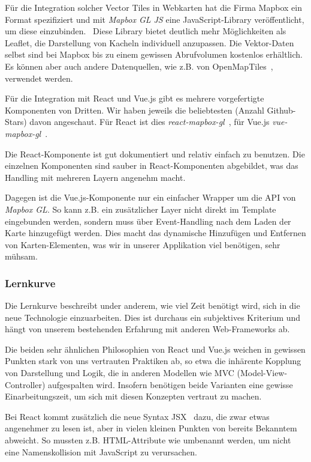 Für die Integration solcher Vector Tiles in Webkarten hat die Firma Mapbox ein Format spezifiziert und mit \emph{Mapbox GL JS} eine JavaScript-Library veröffentlicht, um diese einzubinden.~\cite{mapbox_gl_js}
Diese Library bietet deutlich mehr Möglichkeiten als Leaflet, die Darstellung von Kacheln individuell anzupassen.
Die Vektor-Daten selbst sind bei Mapbox bis zu einem gewissen Abrufvolumen kostenlos erhältlich.
Es können aber auch andere Datenquellen, wie z.B. von OpenMapTiles~\cite{openmaptiles}, verwendet werden.

Für die Integration mit React und Vue.js gibt es mehrere vorgefertigte Komponenten von Dritten.
Wir haben jeweils die beliebtesten (Anzahl Github-Stars) davon angeschaut.
Für React ist dies \emph{react-mapbox-gl}~\cite{react_mapbox_gl}, für Vue.js \emph{vue-mapbox-gl}~\cite{vue_mapbox_gl}.

Die React-Komponente ist gut dokumentiert und relativ einfach zu benutzen.
Die einzelnen Komponenten sind sauber in React-Komponenten abgebildet, was das Handling mit mehreren Layern angenehm macht.

Dagegen ist die Vue.js-Komponente nur ein einfacher Wrapper um die API von \emph{Mapbox GL}.
So kann z.B. ein zusätzlicher Layer nicht direkt im Template eingebunden werden, sondern muss über Event-Handling nach dem Laden der Karte hinzugefügt werden.
Dies macht das dynamische Hinzufügen und Entfernen von Karten-Elementen, was wir in unserer Applikation viel benötigen, sehr mühsam.

\subsubsection{Lernkurve}
\label{Analyse Framework:Lernkurve}

Die Lernkurve beschreibt under anderem, wie viel Zeit benötigt wird, sich in die neue Technologie einzuarbeiten.
Dies ist durchaus ein subjektives Kriterium und hängt von unserem bestehenden Erfahrung mit anderen Web-Frameworks ab.

Die beiden sehr ähnlichen Philosophien von React und Vue.js weichen in gewissen Punkten stark von uns vertrauten Praktiken ab, so etwa die inhärente Kopplung von Darstellung und Logik, die in anderen Modellen wie MVC (Model-View-Controller) aufgespalten wird.
Insofern benötigen beide Varianten eine gewisse Einarbeitungszeit, um sich mit diesen Konzepten vertraut zu machen.

Bei React kommt zusätzlich die neue Syntax JSX~\cite{jsx} dazu, die zwar etwas angenehmer zu lesen ist, aber in vielen kleinen Punkten von bereits Bekanntem abweicht.
So mussten z.B. HTML-Attribute wie  umbenannt werden, um nicht eine Namenskollision mit JavaScript zu verursachen.

